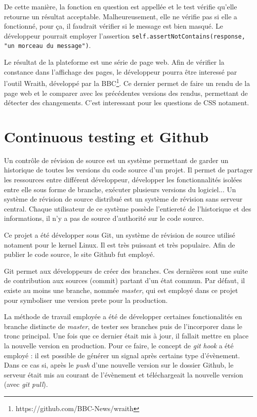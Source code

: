 \documentclass[a4paper,12pt]{article}
\begin{document}
De cette manière, la fonction en question est appellée et le test vérifie qu'elle
retourne un résultat acceptable. Malheureusement, elle ne vérifie pas si elle a fonctionné,
pour ça, il faudrait vérifier si le message est bien masqué. Le développeur pourrait
employer l'assertion \texttt{self.assertNotContains(response, "un morceau du message")}.

Le résultat de la plateforme est une série de page web. Afin de vérifier la constance
dans l'affichage des pages, le développeur pourra être interessé par l'outil Wraith,
développé par la BBC\footnote{https://github.com/BBC-News/wraith}. Ce dernier
permet de faire un rendu de la page web et le comparer avec les précédentes versions
des rendus, permettant de détecter des changements. C'est interessant pour les
questions de CSS notament.


\section{Continuous testing et Github}

Un contrôle de révision de source est un système permettant de garder un historique
de toutes les versions du code source d'un projet. Il permet de partager les ressources
entre différent développeur, développer les fonctionnalités isolées entre elle sous
forme de branche, exécuter plusieurs versions du logiciel... Un système de révision
de source distribué est un système de révision sans serveur central. Chaque
utilisateur de ce système possède l'entiereté de l'historique et des informations,
il n'y a pas de source d'authorité sur le code source.

Ce projet a été développer sous Git, un système de révision de source utilisé notament
pour le kernel Linux. Il est très puissant et très populaire. Afin de publier le code
source, le site Github fut employé.

Git permet aux développeurs de créer des branches. Ces dernières sont une suite de
contribution aux sources (commit) partant d'un état commun. Par défaut, il existe
au moins une branche, nommée \textit{master}, qui est employé dans ce projet
pour symboliser une version prete pour la production.

La méthode de travail employée a été de développer certaines fonctionalités en branche
distincte de \textit{master}, de tester ses branches puis de l'incorporer dans
le tronc principal. Une fois que ce dernier était mis à jour, il fallait mettre en
place la nouvelle version en production. Pour ce faire, le concept de \textit{git hook}
a été employé : il est possible de générer un signal après certains type d'évènement.
Dans ce cas si, après le \textit{push} d'une nouvelle version sur le dossier Github,
le serveur était mis au courant de l'évènement et téléchargeait la nouvelle version (avec
\textit{git pull}).
\end{document}
